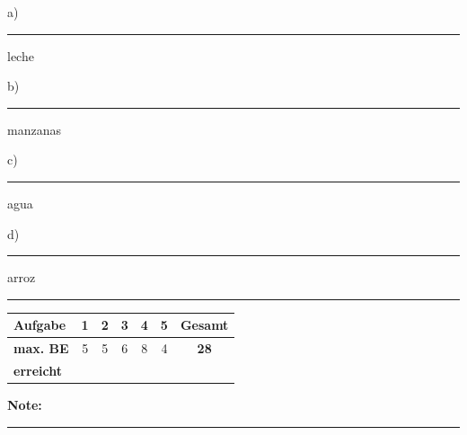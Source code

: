 \documentclass[11pt, a4paper]{article}
\newcommand{\luecke}[1]{\rule{#1}{0.4pt}}
\begin{document}
\vspace{0.5em}

\noindent
a) \luecke{3.5cm} leche

\vspace{0.8em}

\noindent
b) \luecke{3.5cm} manzanas

\vspace{0.8em}

\noindent
c) \luecke{3.5cm} agua

\vspace{0.8em}

\noindent
d) \luecke{3.5cm} arroz


\vspace{25pt}
\hrule
\vspace{10pt}

\noindent
\begin{tabularx}{\textwidth}{|X|c|c|c|c|c||c|}
\hline
\textbf{Aufgabe} & 1 & 2 & 3 & 4 & 5 & \textbf{Gesamt} \\
\hline
\textbf{max. BE} & 5 & 5 & 6 & 8 & 4 & \textbf{28} \\
\hline
\textbf{erreicht} & & & & & & \\[0.8em]
\hline
\end{tabularx}

\vspace{10pt}

\begin{flushright}
\textbf{Note:} \luecke{2cm}
\end{flushright}
\end{document}
